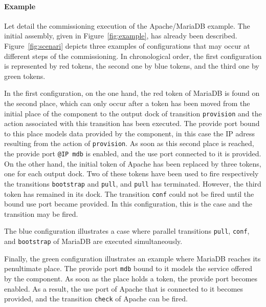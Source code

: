 \paragraph{Example}{
Let detail the commissioning execution of the Apache/MariaDB
example. The initial assembly, given in Figure~\ref{fig:example}, has
already been described. Figure~\ref{fig:scenari} depicts three examples of
configurations that may occur at different steps of the
commissioning. In chronological order, the first configuration is
represented by red tokens, the second one by blue tokens, and the
third one by green tokens.

In the first configuration, on the one hand, the red token of MariaDB
is found on the second place, which can only occur after a token has
been moved from the initial place of the component to the output dock
of transition \texttt{provision} and the action associated with this
transition has been executed. The provide port bound to this place
models data provided by the component, in this case the IP adress
resulting from the action of \texttt{provision}. As soon as this
second place is reached, the provide port \texttt{@IP mdb} is enabled,
and the use port connected to it is provided. On the other hand, the
initial token of Apache has been replaced by three tokens, one for
each output dock. Two of these tokens have been used to fire
respectively the transitions \texttt{bootstrap} and \texttt{pull}, and
\texttt{pull} has terminated. However, the third token has remained in
its dock. The transition \texttt{conf} could not be fired until the
bound use port became provided. In this configuration, this is the
case and the transition may be fired.

The blue configuration illustrates a case where parallel transitions
\texttt{pull}, \texttt{conf}, and \texttt{bootstrap} of MariaDB are
executed simultaneously.

Finally, the green configuration illustrates an example where MariaDB
reaches its penultimate place. The provide port \texttt{mdb} bound to
it models the service offered by the component. As soon as the place
holds a token, the provide port becomes enabled. As a result, the use
port of Apache that is connected to it becomes provided, and the
transition \texttt{check} of Apache can be fired.}
